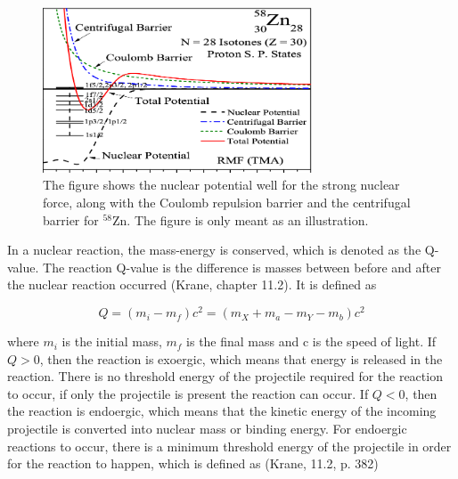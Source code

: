 \documentclass[a4paper,11pt,twoside]{book}
\begin{document}
\begin{figure}
    \centering
    \includegraphics[width=8cm]{Theory/sum_of_potentials.png}
    \caption{The figure shows the nuclear potential well for the strong nuclear force, along with the Coulomb repulsion barrier and the centrifugal barrier for $^{58}$Zn. The figure is only meant as an illustration. %
    }
    \label{fig:sumOfPotentials}
\end{figure}

\noindent In a nuclear reaction, the mass-energy is conserved, which is denoted as the Q-value. The reaction Q-value is the difference is masses between before and after the nuclear reaction occurred (Krane, chapter 11.2). It is defined as 

\begin{equation}
    Q = (m_i - m_f)c^2 = (m_X + m_a - m_Y - m_b)c^2
\end{equation}

\noindent where $m_i$ is the initial mass, $m_f$ is the final mass and c is the speed of light. If $Q>0$, then the reaction is exoergic, which means that energy is released in the reaction. There is no threshold energy of the projectile required for the reaction to occur, if only the projectile is present the reaction can occur. If $Q<0$, then the reaction is endoergic, which means that the kinetic energy of the incoming projectile is converted into nuclear mass or binding energy. For endoergic reactions to occur, there is a minimum threshold energy of the projectile in order for the reaction to happen, which is defined as (Krane, 11.2, p. 382)
\end{document}
